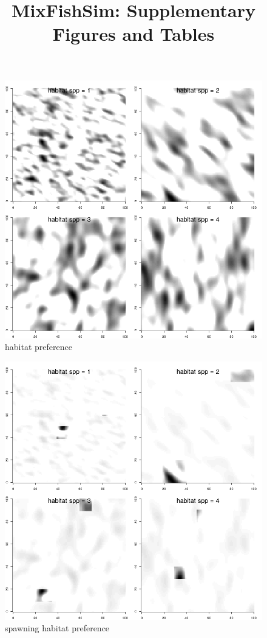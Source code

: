 \documentclass[review]{elsarticle}
\title{MixFishSim: Supplementary Figures and Tables}
\newcommand{\beginsupplement}{%
		        \setcounter{table}{0}
		        \renewcommand{\thetable}{S\arabic{table}}%
		        \setcounter{figure}{0}
		        \renewcommand{\thefigure}{S\arabic{figure}}%
			     }
\begin{document}
\beginsupplement
\maketitle

\begin{figure}[!ht]
	\includegraphics[width = \linewidth]{../analysis/habitat}
	\caption{habitat preference}
	\label{fig:1}
\end{figure}	

\begin{figure}[!ht]
	\includegraphics[width = \linewidth]{../analysis/habitat_spwn}
	\caption{spawning habitat preference}
	\label{fig:2}
\end{figure}	
\end{document}
